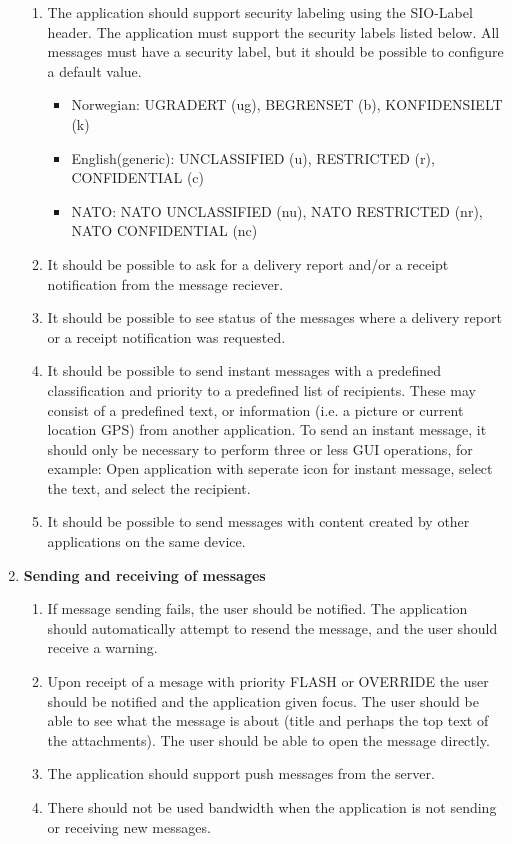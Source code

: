 \begin{enumerate}
\begin{enumerate}
\item{}The application should support security labeling using the SIO-Label header. The application must support the security labels listed below. All messages must have a security label, but it should be possible to configure a default value.
\begin{itemize}
\item{}Norwegian: UGRADERT (ug), BEGRENSET (b), KONFIDENSIELT (k)
\item{}English(generic): UNCLASSIFIED (u), RESTRICTED (r), CONFIDENTIAL (c)
\item{}NATO: NATO UNCLASSIFIED (nu), NATO RESTRICTED (nr), NATO CONFIDENTIAL (nc)
\end{itemize}
\item{}It should be possible to ask for a delivery report and/or a receipt notification from the message reciever.
\item{}It should be possible to see status of the messages where a delivery report or a receipt notification was requested.
\item{}It should be possible to send instant messages with a predefined classification and priority to a predefined list of recipients. These may consist of a predefined text, or information (i.e. a picture or current location GPS) from another application. To send an instant message, it should only be necessary to perform three or less GUI operations, for example: Open application with seperate icon for instant message, select the text, and select the recipient.
\item{}It should be possible to send messages with content created by other applications on the same device.
\end{enumerate}
\item{}\textbf{Sending and receiving of messages}
\begin{enumerate}
\item{}If message sending fails, the user should be notified. The application should automatically attempt to resend the message, and the user should receive a warning.
\item{}Upon receipt of a mesage with priority FLASH or OVERRIDE the user should be notified and the application given focus. The user should be able to see what the message is about (title and perhaps the top text of the attachments). The user should be able to open the message directly.
\item{}The application should support push messages from the server.
\item{}There should not be used bandwidth when the application is not sending or receiving new messages.

\end{enumerate}
\end{enumerate}
